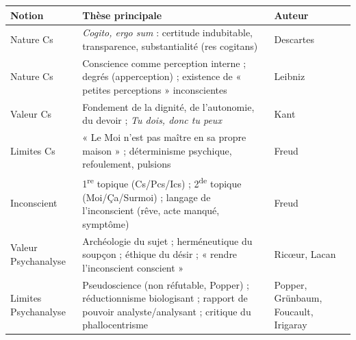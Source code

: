 \documentclass[11pt]{article}
\begin{document}
\begin{aretenir}
\begin{center}
\begin{tabularx}{\linewidth}{|l|X|l|}
\hline
\rowcolor{popblueL}
\textbf{Notion} & \textbf{Thèse principale} & \textbf{Auteur} \\
\hline
Nature Cs & \emph{Cogito, ergo sum} : certitude indubitable, transparence, substantialité (res cogitans) & Descartes \\
\hline
Nature Cs & Conscience comme perception interne ; degrés (apperception) ; existence de « petites perceptions » inconscientes & Leibniz \\
\hline
Valeur Cs & Fondement de la dignité, de l'autonomie, du devoir ; \emph{Tu dois, donc tu peux} & Kant \\
\hline
Limites Cs & « Le Moi n'est pas maître en sa propre maison » ; déterminisme psychique, refoulement, pulsions & Freud \\
\hline
Inconscient & 1\textsuperscript{re} topique (Cs/Pcs/Ics) ; 2\textsuperscript{de} topique (Moi/Ça/Surmoi) ; langage de l'inconscient (rêve, acte manqué, symptôme) & Freud \\
\hline
Valeur Psychanalyse & Archéologie du sujet ; herméneutique du soupçon ; éthique du désir ; « rendre l'inconscient conscient » & Ricœur, Lacan \\
\hline
Limites Psychanalyse & Pseudoscience (non réfutable, Popper) ; réductionnisme biologisant ; rapport de pouvoir analyste/analysant ; critique du phallocentrisme & Popper, Grünbaum, Foucault, Irigaray \\
\hline
\end{tabularx}
\end{center}
\end{aretenir}
\end{document}
